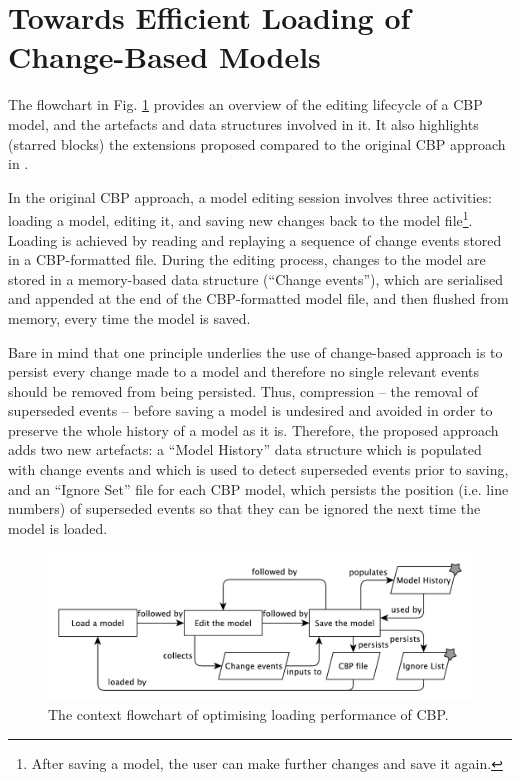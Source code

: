 \documentclass{llncs}
\begin{document}

\section{Towards Efficient Loading of Change-Based Models}
\label{sec:loading_time_optimisation}
The flowchart in Fig. \ref{fig:flowchart} provides an overview of the editing lifecycle of a CBP model, and the artefacts and data structures involved in it. It also highlights (starred blocks) the extensions proposed compared to the original CBP approach in \cite{yohannis2017turning}.

In the original CBP approach, a model editing session involves three activities: loading a model, editing it, and saving new changes back to the model file\footnote{After saving a model, the user can make further changes and save it again.}. Loading is achieved by reading and replaying a sequence of change events stored in a CBP-formatted file. During the editing process, changes to the model are stored in a memory-based data structure (``Change events''), which are serialised and appended at the end of the CBP-formatted model file, and then flushed from memory, every time the model is saved.

Bare in mind that one principle underlies the use of change-based approach is to persist every change made to a model and therefore no single relevant events should be removed from being persisted. Thus, compression -- the removal of superseded events -- before saving a model is undesired and avoided in order to preserve the whole history of a model as it is. Therefore, the proposed approach adds two new artefacts: a ``Model History'' data structure which is populated with change events and which is used to detect superseded events prior to saving, and an ``Ignore Set'' file for each CBP model, which persists the position (i.e. line numbers) of superseded events so that they can be ignored the next time the model is loaded. 

\begin{figure}[ht]
\centering
\includegraphics[width=\linewidth]{flowchart}
\caption{The context flowchart of optimising loading performance of CBP.}
\label{fig:flowchart}
\end{figure}
\end{document}
